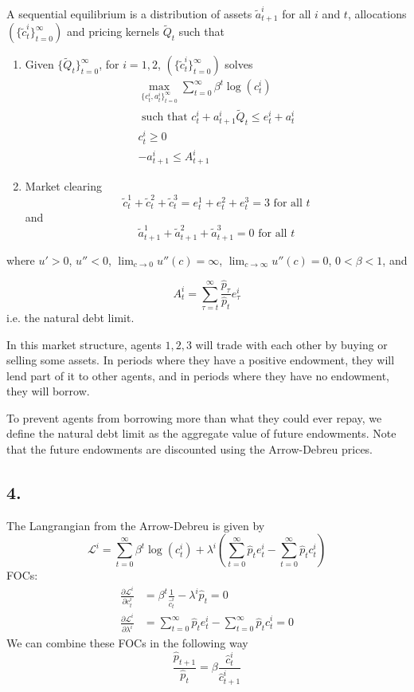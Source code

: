 \documentclass[12pt]{article}
\theoremstyle{definition}
\newcommand\st{\text{ such that }}
\newcommand\seq[1]{\{ #1 \}}
\begin{document}
A sequential equilibrium is a distribution of assets $\tilde{a}_{t+1}^i$ for all $i$ and $t$, allocations $(\seq{\tilde{c}^i_t}_{t=0}^{\infty})$ and pricing kernels $\tilde{Q}_t$ such that
\begin{enumerate}
	\item Given $\seq{\tilde{Q}_t}_{t=0}^{\infty}$, for $i = 1, 2$, $(\seq{\tilde{c}^i_t}_{t=0}^{\infty})$ solves
	\[
	\begin{split}
	\max_{\seq{c^i_t, a_{t}^i}_{t=0}^{\infty}} \sum_{t=0}^{\infty}\beta^t \log(c_t^i)\\
	\st c_t^i+ a_{t+1}^i \tilde{Q}_t \leq e_t^i + a_{t}^i \\
	c_{t}^i\geq 0\\
	-a_{t+1}^i\leq A_{t+1}^i
	\end{split}
	\]
	\item Market clearing
	\[\tilde{c}_t^1+\tilde{c}_t^2 + \tilde{c}_t^3=e_t^1+e_t^2 + e_t^3 =3 \text{ for all }t \] and
	\[
	\tilde{a}_{t+1}^1 + \tilde{a}_{t+1}^2 + \tilde{a}_{t+1}^3  = 0 \text{ for all }t
	\]
\end{enumerate}
where $u'>0$, $u''<0$, $\lim_{c\to 0} u''(c)=\infty$, $\lim_{c\to \infty} u''(c)=0$, $0<\beta<1$, and 

\[
A_{t}^i = \sum_{\tau =t}^\infty \frac{\hat{p}_\tau}{\hat{p}_t} e_\tau^i
\]
i.e. the natural debt limit.

In this market structure, agents $1,2,3$ will trade with each other by buying or selling some assets. In periods where they have a positive endowment, they will lend part of it to other agents, and in periods where they have no endowment, they will borrow. 

To prevent agents from borrowing more than what they could ever repay, we define the natural debt limit as the aggregate value of future endowments. Note that the future endowments are discounted using the Arrow-Debreu prices.

\subsection*{4.}

The Langrangian from the Arrow-Debreu is given by
\[
\mathcal{L}^i = \sum_{t=0}^{\infty}\beta^t \log(c_t^i) + \lambda^i (\sum_{t=0}^{\infty}\hat{p}_te_t^i - \sum_{t=0}^{\infty}\hat{p}_tc_t^i)
\]
FOCs:
\begin{align*}
\frac{\partial \mathcal{L}^i}{\partial c_t^i} & = \beta^t \frac{1}{\hat{c}_t^i} - \lambda^i \hat{p}_t =0 \\
\frac{\partial \mathcal{L}^i}{\partial \lambda^i} & = \sum_{t=0}^{\infty}\hat{p}_te_t^i - \sum_{t=0}^{\infty}\hat{p}_t \hat{c}_t^i =0
\end{align*}
We can combine these FOCs in the following way
\[
\boxed{\frac{\hat{p}_{t+1}}{\hat{p}_t} = \beta \frac{\hat{c}_t^i}{\hat{c}_{t+1}^i}}
\]
\end{document}
